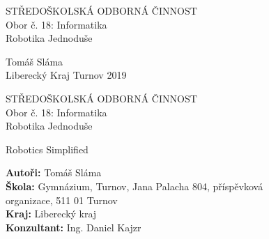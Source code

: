\documentclass[a4paper, 12pt, twoside]{article}
\begin{document}
  \sloppy %



  \bfseries

  \begin{center}
    {\fontsize{18}{21.6} \selectfont STŘEDOŠKOLSKÁ ODBORNÁ ČINNOST}\\%
    \vspace*{\baselineskip}
    {\fontsize{14}{16.8} \selectfont Obor č. 18: Informatika}\\%

    \vspace{16em}
    {\fontsize{20}{24} \selectfont Robotika Jednoduše}%
    \vspace*{\fill}
  \end{center}

  \fontsize{16}{19.2} \selectfont
  Tomáš Sláma\\
  Liberecký Kraj
  \hfill
  Turnov 2019

  \cleardoublepage


  \begin{center}
    {\fontsize{18}{21.6} \selectfont STŘEDOŠKOLSKÁ ODBORNÁ ČINNOST}\\%
    \vspace*{\baselineskip}
    {\fontsize{14}{16.8} \selectfont Obor č. 18: Informatika}\\%

    \vspace{10em}
    \fontsize{20}{24} \selectfont
    Robotika Jednoduše%

    Robotics Simplified%
    \vspace*{\fill}
  \end{center}

  \normalfont
  \fontsize{16}{19.6} \selectfont

  \textbf{Autoři:} Tomáš Sláma\\
  \textbf{Škola:} Gymnázium, Turnov, Jana Palacha 804, příspěvková \\ organizace, 511 01 Turnov \\
  \textbf{Kraj:} Liberecký kraj \\
  \textbf{Konzultant:} Ing. Daniel Kajzr

  \vspace{\baselineskip}
\end{document}
